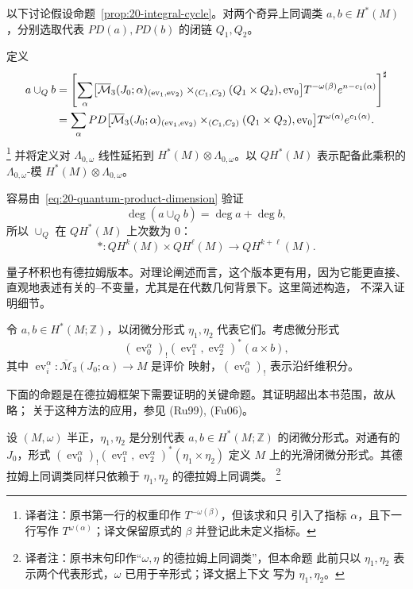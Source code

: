 以下讨论假设命题~\ref{prop:20-integral-cycle}。对两个奇异上同调类
$a,b\in H^*(M)$，分别选取代表 $PD(a),PD(b)$ 的闭链 $Q_1,Q_2$。

\begin{definition}[量子杯积]
\label{def:20-quantum-cup-product}
定义
\begin{align}
 a\cup_Qb
 &=\left[\sum_\alpha\bigl[
 \overline{\mathcal M}_3(J_0;\alpha)_{(\operatorname{ev}_1,\operatorname{ev}_2)}
 \times_{(C_1,C_2)}(Q_1\times Q_2),\operatorname{ev}_0\bigr]
 T^{-\omega(\beta)}e^{n-c_1(\alpha)}\right]^\sharp \notag\\
 &=\sum_\alpha PD\bigl[
 \overline{\mathcal M}_3(J_0;\alpha)_{(\operatorname{ev}_1,\operatorname{ev}_2)}
 \times_{(C_1,C_2)}(Q_1\times Q_2),\operatorname{ev}_0\bigr]
 T^{\omega(\alpha)}e^{c_1(\alpha)}.
 \label{eq:20-quantum-cup-product}
\end{align}
\footnote{译者注：原书第一行的\personNovikov{}权重印作 $T^{-\omega(\beta)}$，但该求和只
引入了指标 $\alpha$，且下一行写作 $T^{\omega(\alpha)}$；译文保留原式的 $\beta$
并登记此未定义指标。}
并将定义对 $\Lambda_{0,\omega}$ 线性延拓到
$H^*(M)\otimes\Lambda_{0,\omega}$。以 $QH^*(M)$ 表示配备此乘积的
$\Lambda_{0,\omega}$-模 $H^*(M)\otimes\Lambda_{0,\omega}$。
\end{definition}

容易由~\eqref{eq:20-quantum-product-dimension} 验证
\[
 \deg(a\cup_Qb)=\deg a+\deg b,
\]
所以 $\cup_Q$ 在 $QH^*(M)$ 上次数为 $0$：
\[
 *:QH^k(M)\times QH^\ell(M)\longrightarrow QH^{k+\ell}(M).
\]

量子杯积也有德拉姆版本。对理论阐述而言，这个版本更有用，因为它能更直接、
直观地表述有关的\personGromov{}--\personWitten{}不变量，尤其是在代数几何背景下。这里简述构造，
不深入证明细节。

令 $a,b\in H^*(M;\mathbb Z)$，以闭微分形式 $\eta_1,\eta_2$ 代表它们。考虑微分形式
\[
 (\operatorname{ev}_0^\alpha)_!
 (\operatorname{ev}_1^\alpha,\operatorname{ev}_2^\alpha)^*(a\times b),
\]
其中 $\operatorname{ev}_i^\alpha:\overline{\mathcal M}_3(J_0;\alpha)\to M$ 是评价
映射，$(\operatorname{ev}_0^\alpha)_!$ 表示沿纤维积分。

下面的命题是在德拉姆框架下需要证明的关键命题。其证明超出本书范围，故从略；
关于这种方法的应用，参见 (Ru99), (Fu06)。

\begin{proposition}
\label{prop:20-derham-quantum-product}
设 $(M,\omega)$ 半正，$\eta_1,\eta_2$ 是分别代表
$a,b\in H^*(M;\mathbb Z)$ 的闭微分形式。对通有的 $J_0$，形式
$(\operatorname{ev}_0^\alpha)_!
(\operatorname{ev}_1^\alpha,\operatorname{ev}_2^\alpha)^*(\eta_1\times\eta_2)$
定义 $M$ 上的光滑闭微分形式。其德拉姆上同调类同样只依赖于
$\eta_1,\eta_2$ 的德拉姆上同调类。
\footnote{译者注：原书末句印作“$\omega,\eta$ 的德拉姆上同调类”，但本命题
此前只以 $\eta_1,\eta_2$ 表示两个代表形式，$\omega$ 已用于辛形式；译文据上下文
写为 $\eta_1,\eta_2$。}
\end{proposition}


